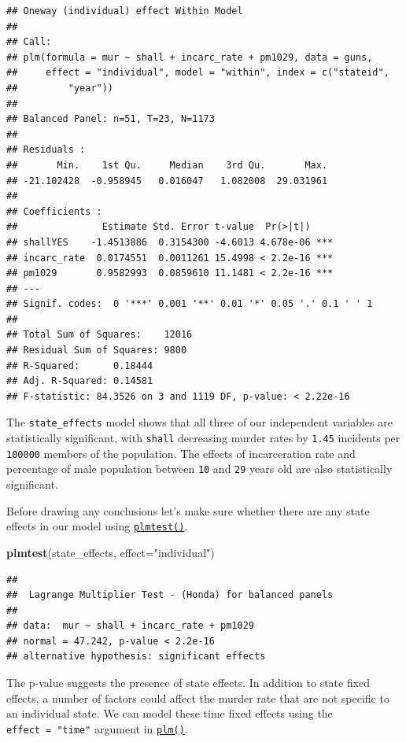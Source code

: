 \documentclass[]{article}
\newenvironment{Shaded}{\begin{snugshade}}{\end{snugshade}}
\newcommand{\KeywordTok}[1]{\textcolor[rgb]{0.13,0.29,0.53}{\textbf{{#1}}}}
\newcommand{\DataTypeTok}[1]{\textcolor[rgb]{0.13,0.29,0.53}{{#1}}}
\newcommand{\StringTok}[1]{\textcolor[rgb]{0.31,0.60,0.02}{{#1}}}
\newcommand{\NormalTok}[1]{{#1}}
\theoremstyle{definition}
\theoremstyle{definition}
\theoremstyle{remark}
\begin{document}
\begin{verbatim}
## Oneway (individual) effect Within Model
## 
## Call:
## plm(formula = mur ~ shall + incarc_rate + pm1029, data = guns, 
##     effect = "individual", model = "within", index = c("stateid", 
##         "year"))
## 
## Balanced Panel: n=51, T=23, N=1173
## 
## Residuals :
##       Min.    1st Qu.     Median    3rd Qu.       Max. 
## -21.102428  -0.958945   0.016047   1.082008  29.031961 
## 
## Coefficients :
##               Estimate Std. Error t-value  Pr(>|t|)    
## shallYES    -1.4513886  0.3154300 -4.6013 4.678e-06 ***
## incarc_rate  0.0174551  0.0011261 15.4998 < 2.2e-16 ***
## pm1029       0.9582993  0.0859610 11.1481 < 2.2e-16 ***
## ---
## Signif. codes:  0 '***' 0.001 '**' 0.01 '*' 0.05 '.' 0.1 ' ' 1
## 
## Total Sum of Squares:    12016
## Residual Sum of Squares: 9800
## R-Squared:      0.18444
## Adj. R-Squared: 0.14581
## F-statistic: 84.3526 on 3 and 1119 DF, p-value: < 2.22e-16
\end{verbatim}

The \texttt{state\_effects} model shows that all three of our
independent variables are statistically significant, with \texttt{shall}
decreasing murder rates by \texttt{1.45} incidents per \texttt{100000}
members of the population. The effects of incarceration rate and
percentage of male population between \texttt{10} and \texttt{29} years
old are also statistically significant.

Before drawing any conclusions let's make sure whether there are any
state effects in our model using
\href{http://bit.ly/r_plmtest}{\texttt{plmtest()}}.

\begin{Shaded}
\begin{Highlighting}[]
\KeywordTok{plmtest}\NormalTok{(state_effects, }\DataTypeTok{effect=}\StringTok{"individual"}\NormalTok{)}
\end{Highlighting}
\end{Shaded}

\begin{verbatim}
## 
##  Lagrange Multiplier Test - (Honda) for balanced panels
## 
## data:  mur ~ shall + incarc_rate + pm1029
## normal = 47.242, p-value < 2.2e-16
## alternative hypothesis: significant effects
\end{verbatim}

The p-value suggests the presence of state effects. In addition to state
fixed effects, a number of factors could affect the murder rate that are
not specific to an individual state. We can model these time fixed
effects using the \texttt{effect\ =\ "time"} argument in
\href{http://bit.ly/r_plm}{\texttt{plm()}}.
\end{document}
